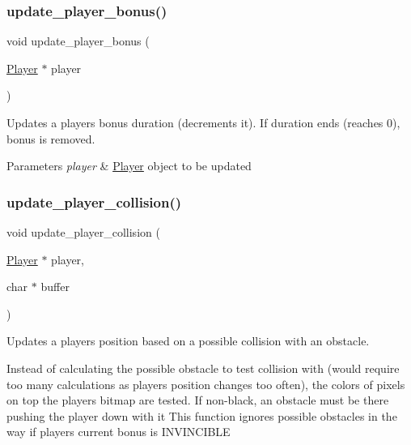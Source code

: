 \subsubsection{\texorpdfstring{update\+\_\+player\+\_\+bonus()}{update\_player\_bonus()}}
{\footnotesize\ttfamily void update\+\_\+player\+\_\+bonus (\begin{DoxyParamCaption}\item[{\hyperlink{struct_player}{Player} $\ast$}]{player }\end{DoxyParamCaption})}



Updates a player\textquotesingle{}s bonus duration (decrements it). If duration ends (reaches 0), bonus is removed. 


\begin{DoxyParams}{Parameters}
{\em player} & \hyperlink{struct_player}{Player} \textquotesingle{}object\textquotesingle{} to be updated \\
\hline
\end{DoxyParams}
\hypertarget{group__player_ga957878c48a3fb1afc3fcd55edf22c4dc}{}\label{group__player_ga957878c48a3fb1afc3fcd55edf22c4dc} 
\subsubsection{\texorpdfstring{update\+\_\+player\+\_\+collision()}{update\_player\_collision()}}
{\footnotesize\ttfamily void update\+\_\+player\+\_\+collision (\begin{DoxyParamCaption}\item[{\hyperlink{struct_player}{Player} $\ast$}]{player,  }\item[{char $\ast$}]{buffer }\end{DoxyParamCaption})}



Updates a player\textquotesingle{}s position based on a possible collision with an obstacle. 

Instead of calculating the possible obstacle to test collision with (would require too many calculations as player\textquotesingle{}s position changes too often), the colors of pixels on top the player\textquotesingle{}s bitmap are tested. If non-\/black, an obstacle must be there pushing the player down with it This function ignores possible obstacles in the way if player\textquotesingle{}s current bonus is I\+N\+V\+I\+N\+C\+I\+B\+LE


